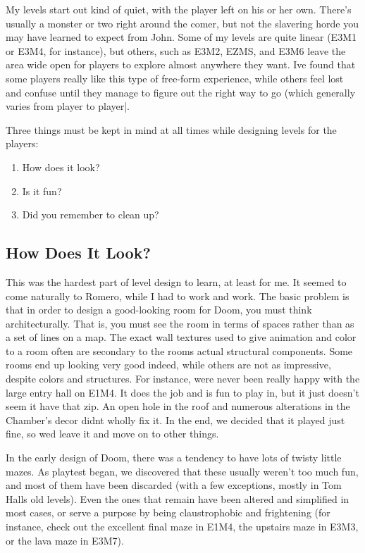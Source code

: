    \par
    My levels start out kind of quiet, with the player left on his or her own. There's usually a monster or two right around the comer, but not the slavering horde you may have learned to expect from John. Some of my levels are quite linear (E3M1 or E3M4, for instance), but others, such as E3M2, EZMS, and E3M6 leave the area wide open for players to explore almost anywhere they want. Ive found that some players really like this type of free-form experience, while others feel lost and confuse until they manage to figure out the right way to go (which generally varies from player to player|.\\
    \par
     Three things must be kept in mind at all times while designing levels for the players:
\begin{enumerate}
\item How does it look?
\item Is it fun?
\item Did you remember to clean up?
\end{enumerate}
\par

\subsection{How Does It Look?}

This was the hardest part of level design to learn, at least for me. It seemed to come naturally to Romero, while I had to work and work. The basic problem is that in order to design a good-looking room for Doom, you must think architecturally. That is, you must see the room in terms of spaces rather than as a set of lines on a map. The exact wall textures used to give animation and color to a room often are secondary to the rooms actual structural components. Some rooms end up looking very good indeed, while others are not as impressive, despite colors and structures. For instance, were never been really happy with the large entry hall on E1M4. It does the job and is fun to play in, but it just doesn't seem it have that zip. An open hole in the roof and numerous alterations in the Chamber's decor didnt wholly fix it. In the end, we decided that it played just fine, so wed leave it and move on to other things.\\
\par
 In the early design of Doom, there was a tendency to have lots of twisty little mazes. As playtest began, we discovered that these usually weren't too much fun, and most of them have been discarded (with a few exceptions, mostly in Tom Halls old levels). Even the ones that remain have been altered and simplified in most cases, or serve a purpose by being claustrophobic and frightening (for instance, check out the excellent final maze in E1M4, the upstairs maze in E3M3, or the lava maze in E3M7).

